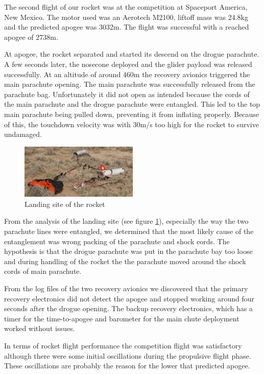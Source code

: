 The second flight of our rocket was at the competition at Spaceport America, New Mexico.
The motor used was an Aerotech M2100, liftoff mass was 24.8kg and the predicted apogee was 3032m.
The flight was successful with a reached apogee of 2738m.

At apogee, the rocket separated and started its descend on the drogue parachute. A few seconds later, the nosecone deployed and the glider payload was released successfully.
At an altitude of around 460m the recovery avionics triggered the main parachute opening.
The main parachute was successfully released from the parachute bag. Unfortunately it did not open as intended because the cords of the main parachute and the drogue parachute were entangled. This led to the top main parachute being pulled down, preventing it from inflating properly.
Because of this, the touchdown velocity was with 30m/s too high for the rocket to survive undamaged.

\begin{figure}[h!]
    \centering
        \includegraphics[width=0.5\textwidth]{img/landing_site.jpg}
        \caption{Landing site of the rocket}
        \label{fig:landing_site}
 \end{figure}

From the analysis of the landing site (see figure \ref{fig:landing_site}), especially the way the two parachute lines were entangled, we determined that the most likely cause of the entanglement was wrong packing of the parachute and shock cords.
The hypothesis is that the drogue parachute was put in the parachute bay too loose and during handling of the rocket the the parachute moved around the shock cords of main parachute.

From the log files of the two recovery avionics we discovered that the primary recovery electronics did not detect the apogee and stopped working around four seconds after the drogue opening.
The backup recovery electronics, which has a timer for the time-to-apogee and barometer for the main chute deployment worked without issues.

In terms of rocket flight performance the competition flight was satisfactory although there were some initial oscillations during the propulsive flight phase.
These oscillations are probably the reason for the lower that predicted apogee.

